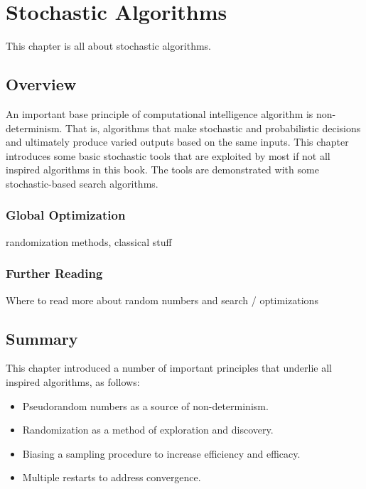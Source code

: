\chapter{Stochastic Algorithms}
\label{ch:stochastic}

This chapter is all about stochastic algorithms.

\section{Overview}

An important base principle of computational intelligence algorithm is non-determinism. That is, algorithms that make stochastic and probabilistic decisions and ultimately produce varied outputs based on the same inputs. This chapter introduces some basic stochastic tools that are exploited by most if not all inspired algorithms in this book. The tools are demonstrated with some stochastic-based search algorithms.

\subsection{Global Optimization}
randomization methods, classical stuff


\subsection{Further Reading}
Where to read more about random numbers and search / optimizations











\section{Summary}
This chapter introduced a number of important principles that underlie all inspired algorithms, as follows:

\begin{itemize}
	\item Pseudorandom numbers as a source of non-determinism.
	\item Randomization as a method of exploration and discovery.
	\item Biasing a sampling procedure to increase efficiency and efficacy.
	\item Multiple restarts to address convergence.	
\end{itemize}

